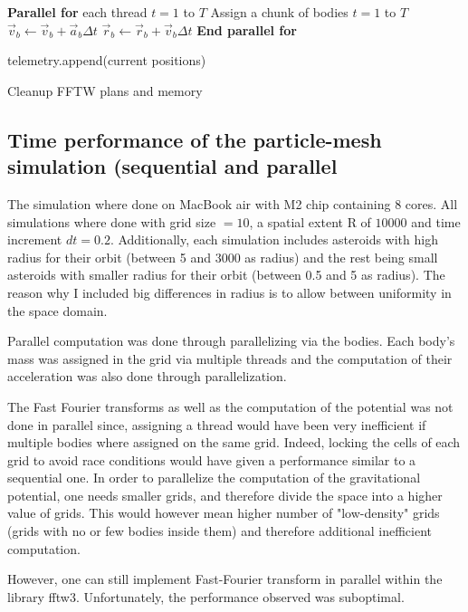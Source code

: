 \documentclass{article}
\begin{document}
\begin{algorithm}[H]
\begin{algorithmic}[1]
    \State \textbf{Parallel for} each thread $t= 1$ to $T$
        \State \quad Assign a chunk of bodies $t=1$ to $T$
                \State $\vec{v}_b \gets \vec{v}_b + \vec{a}_b \Delta t$
                \State $\vec{r}_b \gets \vec{r}_b + \vec{v}_b \Delta t$
        \EndFor
    \State \textbf{End parallel for}

    \State telemetry.append(current positions)
\EndFor

\State Cleanup FFTW plans and memory
\end{algorithmic}
\end{algorithm}
\subsection{Time performance of the particle-mesh simulation (sequential and parallel}
The simulation where done on MacBook air with M2 chip containing 8 cores.
All simulations where done with grid size $= 10$, a spatial extent R of $10 000$ and time increment $dt = 0.2$. Additionally, each simulation includes asteroids with high radius for their orbit (between 5 and 3000  as radius)  and the rest being small asteroids with smaller radius for their orbit (between 0.5 and 5 as radius). The reason why I included big differences in radius is to allow between uniformity in the space domain. 

Parallel computation was done through parallelizing via the bodies. Each body's mass was assigned in the grid via multiple threads and the computation of their acceleration was also done through parallelization. 

The Fast Fourier transforms as well as the computation of the potential was not done in parallel since, assigning a thread would have been very inefficient if multiple bodies where assigned on the same grid. Indeed, locking the cells of each grid to avoid race conditions would have given a performance similar to a sequential one. In order to parallelize the computation of the gravitational potential, one needs smaller grids, and therefore divide the space into a higher value of grids. This would however mean higher number of "low-density" grids (grids with no or few bodies inside them) and therefore additional inefficient computation. 

However, one can still implement Fast-Fourier transform in parallel within the library fftw3. Unfortunately, the performance observed was suboptimal. 
\end{document}

